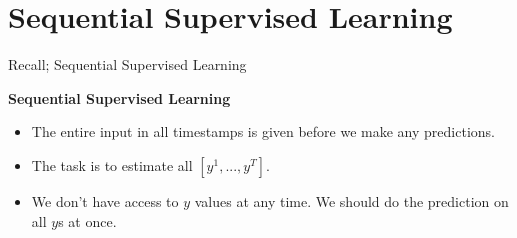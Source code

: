 \documentclass{beamer}
\begin{document}
\section{Sequential Supervised Learning}
	\begin{frame}{Recall; Sequential Supervised Learning}
		\begin{center}
			\textbf{Sequential Supervised Learning}
			\begin{itemize}
				\item The entire input in all timestamps is given before we make any predictions.
				\item The task is to estimate all $[y^1 , ... , y^T]$.
				\item We don't have access to $y$ values at any time. We should do the prediction on all $y$s at once.
			\end{itemize}
		\end{center}
	\end{frame}
\end{document}
